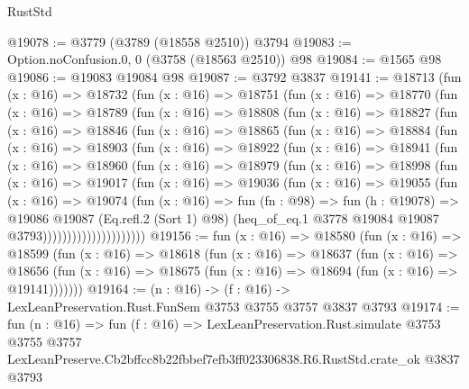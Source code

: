 \begin{lexlean}{RustStd}
\begin{coremodule}
@19078 := @3779 (@3789 (@18558 @2510)) @3794
@19083 := Option.noConfusion.{0, 0} (@3758 (@18563 @2510)) @98
@19084 := @1565 @98
@19086 := @19083 @19084 @98
@19087 := @3792 @3837
@19141 := @18713
    (fun (x : @16) =>
    @18732
      (fun (x : @16) =>
      @18751
        (fun (x : @16) =>
        @18770
          (fun (x : @16) =>
          @18789
            (fun (x : @16) =>
            @18808
              (fun (x : @16) =>
              @18827
                (fun (x : @16) =>
                @18846
                  (fun (x : @16) =>
                  @18865
                    (fun (x : @16) =>
                    @18884
                      (fun (x : @16) =>
                      @18903
                        (fun (x : @16) =>
                        @18922
                          (fun (x : @16) =>
                          @18941
                            (fun (x : @16) =>
                            @18960
                              (fun (x : @16) =>
                              @18979
                                (fun (x : @16) =>
                                @18998
                                  (fun (x : @16) =>
                                  @19017
                                    (fun (x : @16) =>
                                    @19036
                                      (fun (x : @16) =>
                                      @19055
                                        (fun (x : @16) =>
                                        @19074
                                          (fun (x : @16) =>
                                          fun (fn : @98) =>
                                          fun (h : @19078) =>
                                          @19086
                                            @19087
                                            (Eq.refl.{2} (Sort 1) @98)
                                            (heq_of_eq.{1}
                                              @3778
                                              @19084
                                              @19087
                                              @3793)))))))))))))))))))))
@19156 := fun (x : @16) =>
  @18580
    (fun (x : @16) =>
    @18599
      (fun (x : @16) =>
      @18618
        (fun (x : @16) =>
        @18637
          (fun (x : @16) =>
          @18656 (fun (x : @16) => @18675 (fun (x : @16) => @18694 (fun (x : @16) => @19141)))))))
@19164 := (n : @16) -> (f : @16) -> LexLeanPreservation.Rust.FunSem @3753 @3755 @3757 @3837 @3793
@19174 := fun (n : @16) =>
  fun (f : @16) =>
  LexLeanPreservation.Rust.simulate
    @3753
    @3755
    @3757
    LexLeanPreserve.Cb2bffcc8b22fbbef7efb3ff023306838.R6.RustStd.crate_ok
    @3837
    @3793
\end{coremodule}
\end{lexlean}
